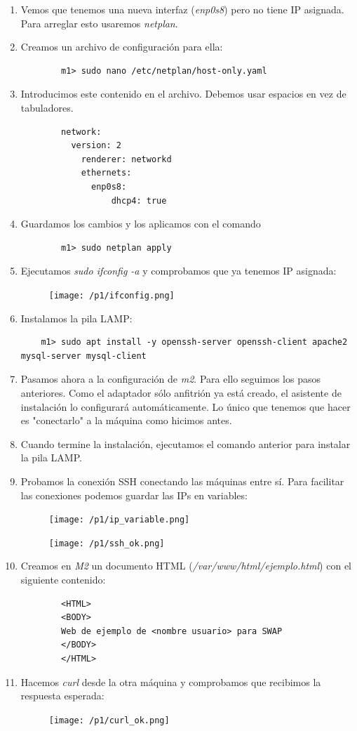 \documentclass[12pt,spanish]{article}
\begin{document}
\begin{enumerate}
	\item Vemos que tenemos una nueva interfaz (\emph{enp0s8}) pero no tiene IP asignada. Para arreglar esto usaremos \emph{netplan}.
	\item Creamos un archivo de configuración para ella:
	\begin{lstlisting}
		m1> sudo nano /etc/netplan/host-only.yaml
	\end{lstlisting}
	\item Introducimos este contenido en el archivo. Debemos usar espacios en vez de tabuladores.
	\begin{lstlisting}
		network:
		  version: 2
			renderer: networkd
			ethernets:
			  enp0s8:
				  dhcp4: true
	\end{lstlisting}
	\item Guardamos los cambios y los aplicamos con el comando
	\begin{lstlisting}
		m1> sudo netplan apply
	\end{lstlisting}
	\item Ejecutamos \emph{sudo ifconfig -a} y comprobamos que ya tenemos IP asignada:
	\begin{figure}[H]
		\centering
		\texttt{[image: /p1/ifconfig.png]}
	\end{figure}
	\item Instalamos la pila LAMP:
	\begin{lstlisting}
	m1> sudo apt install -y openssh-server openssh-client apache2 mysql-server mysql-client
	\end{lstlisting}
	\item Pasamos ahora a la configuración de \emph{m2}. Para ello seguimos los pasos anteriores. Como el adaptador sólo anfitrión ya está creado, el asistente de instalación lo configurará automáticamente. Lo único que tenemos que hacer es "conectarlo" a la máquina como hicimos antes.
	\item Cuando termine la instalación, ejecutamos el comando anterior para instalar la pila LAMP.
	\item Probamos la conexión SSH conectando las máquinas entre sí. Para facilitar las conexiones podemos guardar las IPs en variables:
	\begin{figure}[H]
		\centering
		\texttt{[image: /p1/ip\_variable.png]}
	\end{figure}
	\begin{figure}[H]
		\centering
		\texttt{[image: /p1/ssh\_ok.png]}
	\end{figure}
	\item Creamos en \emph{M2} un documento HTML (\emph{/var/www/html/ejemplo.html}) con el siguiente contenido:
	\begin{lstlisting}
		<HTML>
		<BODY>
		Web de ejemplo de <nombre usuario> para SWAP
		</BODY>
		</HTML>
	\end{lstlisting}
	\item Hacemos \emph{curl} desde la otra máquina y comprobamos que recibimos la respuesta esperada:
	\begin{figure}[H]
		\centering
		\texttt{[image: /p1/curl\_ok.png]}
	\end{figure}
\end{enumerate}
\end{document}

